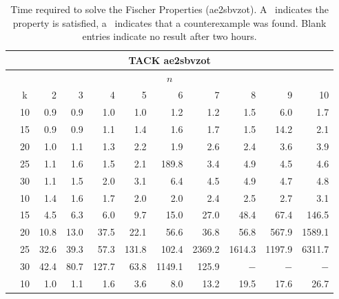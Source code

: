 \documentclass[a4paper,11pt]{report}
\newcommand*\cmark{\small\Checkmark}
\newcommand*{\xmark}{\small\XSolidBrush}
\theoremstyle{definition}
\newcommand{\aez}{ae2sbvzot}
\begin{document}
\begin{table}
\footnotesize
{}
\centering
\caption{Time required to solve the Fischer Properties (\aez). A \cmark\
  indicates the property is satisfied, a \xmark\ indicates that a counterexample
  was found. Blank entries indicate no result after two hours.}
\label{table:fischer-results-aez}
\begin{tabular}{c|c|r r r r r r r r r}
\toprule
\multicolumn{11}{c}{TACK ae2sbvzot} \\
\midrule
\multicolumn{11}{c}{\(n\)} \\
\midrule
& k & 2 & 3 & 4 & 5 & 6 & 7 & 8 & 9 & 10 \\
\midrule
\multirow{5}{1em}{\rotatebox{90}{\textbf{live-one}}}
& 10 & 0.9\cmark & 0.9\cmark & 1.0\cmark & 1.0\cmark & 1.2\cmark & 1.2\cmark & 1.5\cmark & 6.0\cmark & 1.7\cmark \\
& 15 & 0.9\cmark & 0.9\cmark & 1.1\cmark & 1.4\cmark & 1.6\cmark & 1.7\cmark & 1.5\cmark & 14.2\cmark & 2.1\cmark \\
& 20 & 1.0\cmark & 1.1\cmark & 1.3\cmark & 2.2\cmark & 1.9\cmark & 2.6\cmark & 2.4\cmark & 3.6\cmark & 3.9\cmark \\
& 25 & 1.1\cmark & 1.6\cmark & 1.5\cmark & 2.1\cmark & 189.8\cmark & 3.4\cmark & 4.9\cmark & 4.5\cmark & 4.6\cmark \\
& 30 & 1.1\cmark & 1.5\cmark & 2.0\cmark & 3.1\cmark & 6.4\cmark & 4.5\cmark & 4.9\cmark & 4.7\cmark & 4.8\cmark \\
\midrule
\multirow{5}{1em}{\rotatebox{90}{\textbf{live-two}}}
& 10 & 1.4\cmark & 1.6\cmark & 1.7\cmark & 2.0\cmark & 2.0\cmark & 2.4\cmark & 2.5\cmark & 2.7\cmark & 3.1\cmark \\
& 15 & 4.5\cmark & 6.3\cmark & 6.0\cmark & 9.7\cmark & 15.0\cmark & 27.0\cmark & 48.4\cmark & 67.4\cmark & 146.5\cmark \\
& 20 & 10.8\cmark & 13.0\cmark & 37.5\cmark & 22.1\cmark & 56.6\cmark & 36.8\cmark & 56.8\cmark & 567.9\cmark & 1589.1\cmark \\
& 25 & 32.6\cmark & 39.3\cmark & 57.3\cmark & 131.8\cmark & 102.4\cmark & 2369.2\cmark & 1614.3\cmark & 1197.9\cmark & 6311.7\cmark \\
& 30 & 42.4\cmark & 80.7\cmark & 127.7\cmark & 63.8\cmark & 1149.1\cmark & 125.9\cmark & $-$ & $-$ & $-$ \\
\midrule
\multirow{5}{1em}{\rotatebox{90}{\textbf{live-three}}}
& 10 & 1.0\xmark & 1.1\xmark & 1.6\xmark & 3.6\xmark & 8.0\xmark & 13.2\cmark & 19.5\cmark & 17.6\cmark & 26.7\cmark \\

\end{tabular}
\end{table}
\end{document}
